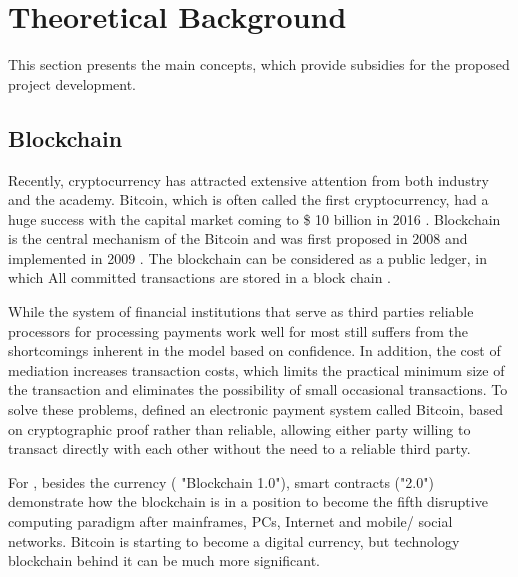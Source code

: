 \section{Theoretical Background} \label{sec:Theoretical}
This section presents the main concepts, which provide subsidies for the proposed project development.


%
%
% 
%

\subsection{Blockchain}\label{sec:blockchain}
Recently, cryptocurrency has attracted extensive attention from both industry and the academy. Bitcoin, which is often called the first cryptocurrency, had a huge success with the capital market coming to \$ 10 billion in 2016 \cite{coindesk}. Blockchain is the central mechanism of the Bitcoin and was first proposed in 2008 and implemented in 2009 \cite{nakamoto2008bitcoin}. The blockchain can be considered as a public ledger, in which All committed transactions are stored in a block chain \cite{zheng2016blockchain}.

While the system of financial institutions that serve as third parties reliable processors for processing payments work well for most still suffers from the shortcomings inherent in the model based on confidence. In addition, the cost of mediation increases transaction costs, which limits the practical minimum size of the transaction and eliminates the possibility of small occasional transactions. To solve these problems, \cite{nakamoto2008bitcoin} defined an electronic payment system called Bitcoin, based on cryptographic proof rather than reliable, allowing either party willing to transact directly with each other without the need to a reliable third party.

For \cite{swan2015blockchain}, besides the currency ( "Blockchain 1.0"), smart contracts ("2.0") demonstrate how the blockchain is in a position to become the fifth disruptive computing paradigm after mainframes, PCs, Internet and mobile/ social networks. Bitcoin is starting to become a digital currency, but technology blockchain behind it can be much more significant.

